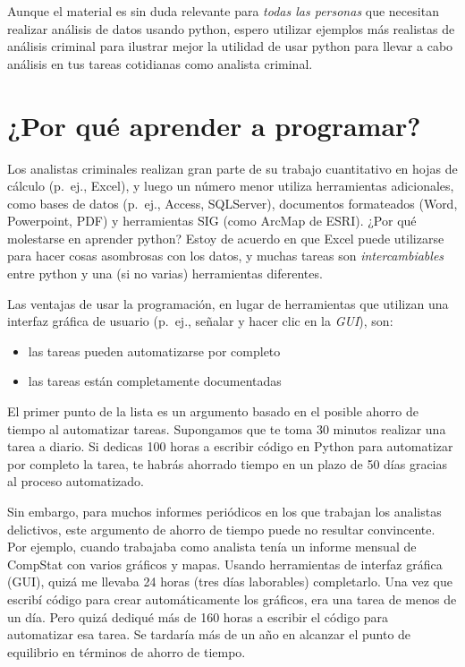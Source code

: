 \documentclass[
  letterpaper,
]{scrbook}
\providecommand{\tightlist}{%
  \setlength{\itemsep}{0pt}\setlength{\parskip}{0pt}}\usepackage{longtable,booktabs,array}
\begin{document}
Aunque el material es sin duda relevante para \emph{todas las personas}
que necesitan realizar análisis de datos usando python, espero utilizar
ejemplos más realistas de análisis criminal para ilustrar mejor la
utilidad de usar python para llevar a cabo análisis en tus tareas
cotidianas como analista criminal.

\section*{¿Por qué aprender a
programar?}\label{por-quuxe9-aprender-a-programar}


Los analistas criminales realizan gran parte de su trabajo cuantitativo
en hojas de cálculo (p.~ej., Excel), y luego un número menor utiliza
herramientas adicionales, como bases de datos (p.~ej., Access,
SQLServer), documentos formateados (Word, Powerpoint, PDF) y
herramientas SIG (como ArcMap de ESRI). ¿Por qué molestarse en aprender
python? Estoy de acuerdo en que Excel puede utilizarse para hacer cosas
asombrosas con los datos, y muchas tareas son \emph{intercambiables}
entre python y una (si no varias) herramientas diferentes.

Las ventajas de usar la programación, en lugar de herramientas que
utilizan una interfaz gráfica de usuario (p.~ej., señalar y hacer clic
en la \emph{GUI}), son:

\begin{itemize}
\tightlist
\item
  las tareas pueden automatizarse por completo
\item
  las tareas están completamente documentadas
\end{itemize}

El primer punto de la lista es un argumento basado en el posible ahorro
de tiempo al automatizar tareas. Supongamos que te toma 30 minutos
realizar una tarea a diario. Si dedicas 100 horas a escribir código en
Python para automatizar por completo la tarea, te habrás ahorrado tiempo
en un plazo de 50 días gracias al proceso automatizado.

Sin embargo, para muchos informes periódicos en los que trabajan los
analistas delictivos, este argumento de ahorro de tiempo puede no
resultar convincente. Por ejemplo, cuando trabajaba como analista tenía
un informe mensual de CompStat con varios gráficos y mapas. Usando
herramientas de interfaz gráfica (GUI), quizá me llevaba 24 horas (tres
días laborables) completarlo. Una vez que escribí código para crear
automáticamente los gráficos, era una tarea de menos de un día. Pero
quizá dediqué más de 160 horas a escribir el código para automatizar esa
tarea. Se tardaría más de un año en alcanzar el punto de equilibrio en
términos de ahorro de tiempo.
\end{document}
